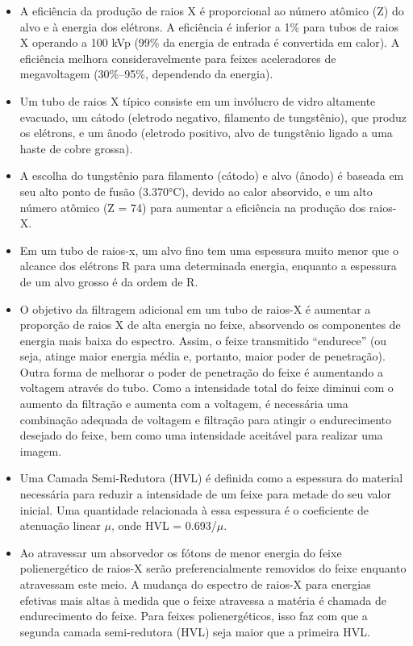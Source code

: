 \documentclass[11pt,a4paper]{article}
\newcounter{exemplo}
\begin{document}
\begin{exemplo}
\begin{itemize}
		\item A eficiência da produção de raios X é proporcional ao número atômico (Z) do alvo e à energia dos elétrons. A eficiência é inferior a 1\% para tubos de raios X operando a 100 kVp (99\% da energia de entrada é convertida em calor). A eficiência melhora consideravelmente para feixes aceleradores de megavoltagem (30\%–95\%, dependendo da energia).
		
		\item Um tubo de raios X típico consiste em um invólucro de vidro altamente evacuado, um cátodo (eletrodo negativo, filamento de tungstênio), que produz os elétrons, e um ânodo (eletrodo positivo, alvo de tungstênio ligado a uma haste de cobre grossa).
		
		\item A escolha do tungstênio para filamento (cátodo) e alvo (ânodo) é baseada em seu alto ponto de fusão (3.370°C), devido ao calor absorvido, e um alto número atômico (Z = 74) para aumentar a eficiência na produção dos raios-X.
		
		\item Em um tubo de raios-x, um alvo fino tem uma espessura muito menor que o alcance dos elétrons R para uma determinada energia, enquanto a espessura de um alvo grosso é da ordem de R.
		
		\item O objetivo da filtragem adicional em um tubo de raios-X é aumentar a proporção de raios X de alta energia no feixe, absorvendo os componentes de energia mais baixa do espectro. Assim, o feixe transmitido “endurece” (ou seja, atinge maior energia média e, portanto, maior poder de penetração). Outra forma de melhorar o poder de penetração do feixe é aumentando a voltagem através do tubo. Como a intensidade total do feixe diminui com o aumento da filtração e aumenta com a voltagem, é necessária uma combinação adequada de voltagem e filtração para atingir o endurecimento desejado do feixe, bem como uma intensidade aceitável para realizar uma imagem.
		
		\item Uma Camada Semi-Redutora (HVL) é definida como a espessura do material necessária para reduzir a intensidade de um feixe para metade do seu valor inicial. Uma quantidade relacionada à essa espessura é o coeficiente de atenuação linear $\mu$, onde HVL = 0.693/$\mu$.
		
		\item Ao atravessar um absorvedor os fótons de menor energia do feixe polienergético de raios-X serão preferencialmente removidos do feixe enquanto atravessam este meio. A mudança do espectro de raios-X para energias efetivas mais altas à medida que o feixe atravessa a matéria é chamada de endurecimento do feixe. Para feixes polienergéticos, isso faz com que a segunda camada semi-redutora (HVL) seja maior que a primeira HVL.
		

\end{itemize}
\end{exemplo}
\end{document}
